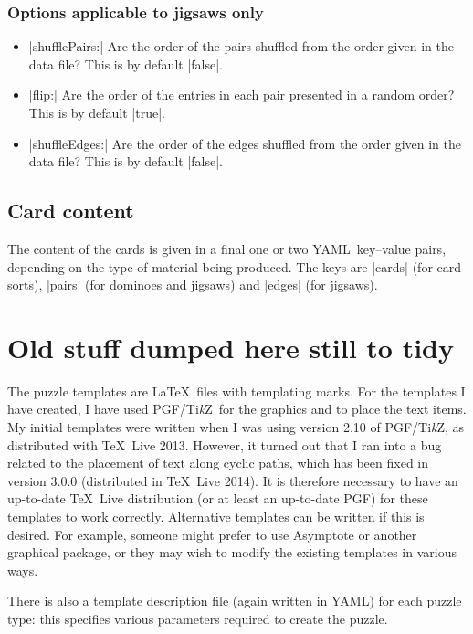 \documentclass{article}
\def\YAML{{\small YAML}}
\def\PGF{{\small PGF}}
\def\TikZ{Ti\emph{k}Z}
\begin{document}
\subsubsection*{Options applicable to jigsaws only}

\begin{itemize}
\item |shufflePairs:| Are the order of the pairs shuffled from
  the order given in the data file?  This is by default |false|.
\item |flip:| Are the order of the entries in each pair presented
  in a random order?  This is by default |true|.
\item |shuffleEdges:| Are the order of the edges shuffled from
  the order given in the data file?  This is by default |false|.
\end{itemize}

\subsection{Card content}

The content of the cards is given in a final one or two \YAML\
key--value pairs, depending on the type of material being produced.
The keys are |cards| (for card sorts), |pairs| (for dominoes and
jigsaws) and |edges| (for jigsaws).

\section{Old stuff dumped here still to tidy}

The puzzle templates are \LaTeX\ files with templating marks.  For the
templates I have created, I have used \PGF/\TikZ\ for the graphics and
to place the text items.  My initial templates were written when I was
using version 2.10 of \PGF/\TikZ, as distributed with \TeX~Live 2013.
However, it turned out that I ran into a bug related to the placement
of text along cyclic paths, which has been fixed in version 3.0.0
(distributed in \TeX~Live 2014).  It is therefore necessary to have an
up-to-date \TeX~Live distribution (or at least an up-to-date \PGF) for
these templates to work correctly.  Alternative templates can be
written if this is desired.  For example, someone might prefer to use
Asymptote or another graphical package, or they may wish to modify the
existing templates in various ways.

There is also a template description file (again written in \YAML) for
each puzzle type: this specifies various parameters required to create
the puzzle.
\end{document}

